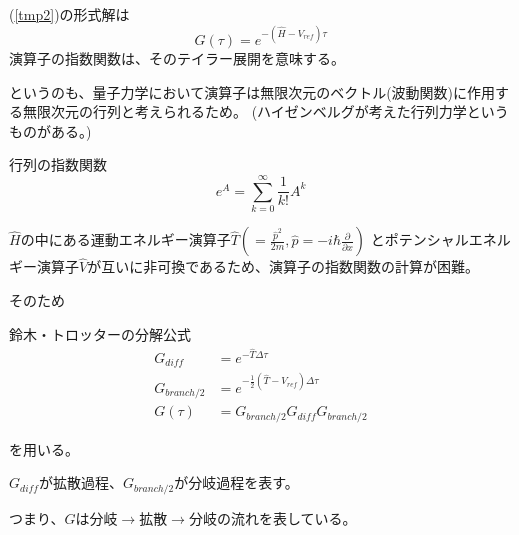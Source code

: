 \documentclass[dvipdfmx]{beamer}
\begin{document}
    \begin{frame}
        (\ref{tmp2})の形式解は
        \begin{equation}
            G(\tau) = e^{-(\hat{H} - V_{ref})\tau}
        \end{equation}
        演算子の指数関数は、そのテイラー展開を意味する。

        というのも、量子力学において演算子は無限次元のベクトル(波動関数)に作用する無限次元の行列と考えられるため。
        (ハイゼンベルグが考えた行列力学というものがある。)

        \begin{block}{行列の指数関数}
            \begin{equation}
                e^A = \sum_{k=0}^\infty \dfrac{1}{k!}A^k
            \end{equation}
        \end{block}
    \end{frame}

    \begin{frame}
        $\hat{H}$の中にある運動エネルギー演算子$\hat{T}(=\frac{\hat{p}^2}{2m},\hat{p} = -i\hbar\frac{\partial}{\partial x})$
        とポテンシャルエネルギー演算子$\hat{V}$が互いに非可換であるため、演算子の指数関数の計算が困難。

        そのため
        \begin{block}{鈴木・トロッターの分解公式}
            \begin{align}
                G_{diff} &= e^{-\hat{T}\Delta\tau} \\
                G_{branch/2} &= e^{-\frac{1}{2}(\hat{T} - V_{ref})\Delta\tau} \\
                G(\tau) &= G_{branch/2}G_{diff}G_{branch/2}
            \end{align}
        \end{block}
        を用いる。

        $G_{diff}$が拡散過程、$G_{branch/2}$が分岐過程を表す。

        つまり、$G$は分岐$\to$拡散$\to$分岐の流れを表している。
    \end{frame}
\end{document}
